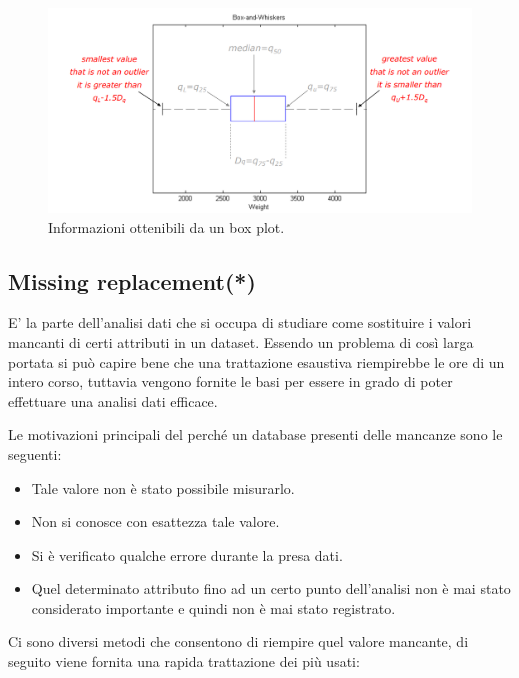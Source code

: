 \begin{figure}[H]
	\centering
	\includegraphics[height=0.4 \linewidth]{introduction/pict/box_plot.png}
	\caption{Informazioni ottenibili da un box plot.}
\end{figure}


\subsection{Missing replacement(*)}

E' la parte dell'analisi dati che si occupa di studiare come sostituire i valori mancanti di certi attributi in un dataset. Essendo un problema di così larga portata si può capire bene che una trattazione esaustiva riempirebbe le ore di un intero corso, tuttavia vengono fornite le basi per essere in grado di poter effettuare una analisi dati efficace. 

Le motivazioni principali del perché un database presenti delle mancanze sono le seguenti:
\begin{itemize}
	\item Tale valore non è stato possibile misurarlo.
	\item Non si conosce con esattezza tale valore.
	\item Si è verificato qualche errore durante la presa dati.
	\item Quel determinato attributo fino ad un certo punto dell'analisi non è mai stato considerato importante e quindi non è mai stato registrato.
\end{itemize}

Ci sono diversi metodi che consentono di riempire quel valore mancante, di seguito viene fornita una rapida trattazione dei più usati:

